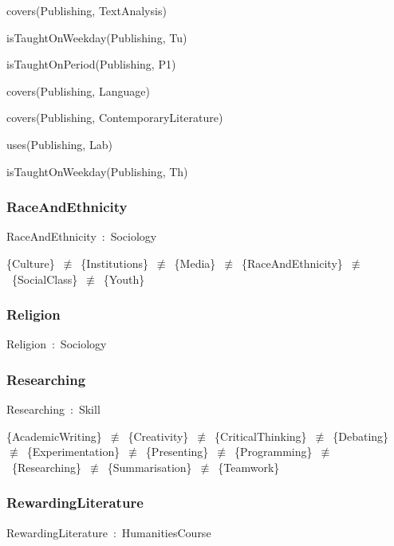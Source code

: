 \documentclass{article}
\begin{document}
covers(Publishing, TextAnalysis)

isTaughtOnWeekday(Publishing, Tu)

isTaughtOnPeriod(Publishing, P1)

covers(Publishing, Language)

covers(Publishing, ContemporaryLiterature)

uses(Publishing, Lab)

isTaughtOnWeekday(Publishing, Th)

\subsubsection*{RaceAndEthnicity}

RaceAndEthnicity~:~Sociology

\{Culture\}~\ensuremath{\not\equiv}~\{Institutions\}~\ensuremath{\not\equiv}~\{Media\}~\ensuremath{\not\equiv}~\{RaceAndEthnicity\}~\ensuremath{\not\equiv}~\{SocialClass\}~\ensuremath{\not\equiv}~\{Youth\}

\subsubsection*{Religion}

Religion~:~Sociology

\subsubsection*{Researching}

Researching~:~Skill

\{AcademicWriting\}~\ensuremath{\not\equiv}~\{Creativity\}~\ensuremath{\not\equiv}~\{CriticalThinking\}~\ensuremath{\not\equiv}~\{Debating\}~\ensuremath{\not\equiv}~\{Experimentation\}~\ensuremath{\not\equiv}~\{Presenting\}~\ensuremath{\not\equiv}~\{Programming\}~\ensuremath{\not\equiv}~\{Researching\}~\ensuremath{\not\equiv}~\{Summarisation\}~\ensuremath{\not\equiv}~\{Teamwork\}

\subsubsection*{RewardingLiterature}

RewardingLiterature~:~HumanitiesCourse
\end{document}
